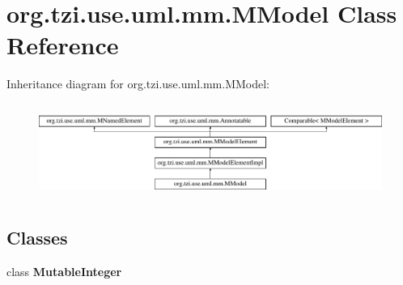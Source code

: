 \hypertarget{classorg_1_1tzi_1_1use_1_1uml_1_1mm_1_1_m_model}{\section{org.\-tzi.\-use.\-uml.\-mm.\-M\-Model Class Reference}
\label{classorg_1_1tzi_1_1use_1_1uml_1_1mm_1_1_m_model}
}
Inheritance diagram for org.\-tzi.\-use.\-uml.\-mm.\-M\-Model\-:\begin{figure}[H]
\begin{center}
\leavevmode
\includegraphics[height=3.111111cm]{classorg_1_1tzi_1_1use_1_1uml_1_1mm_1_1_m_model}
\end{center}
\end{figure}
\subsection*{Classes}
\begin{DoxyCompactItemize}
\item 
class {\bfseries Mutable\-Integer}
\end{DoxyCompactItemize}
